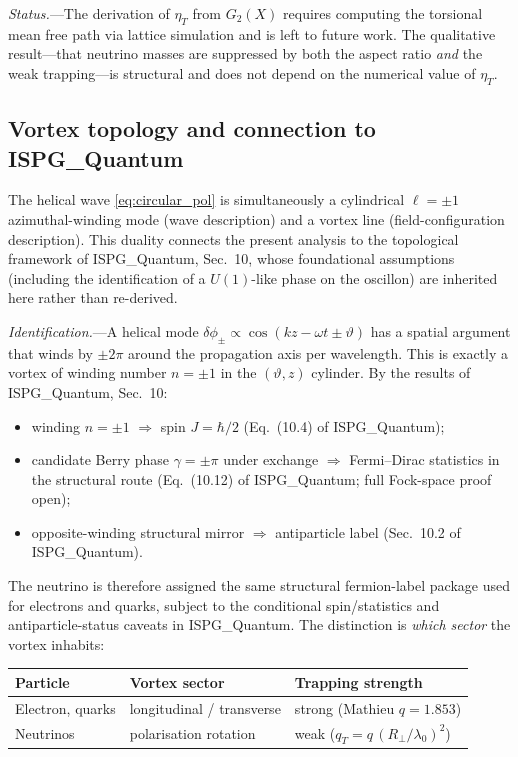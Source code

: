 \documentclass[11pt]{article}
\begin{document}
\textit{Status.}---The derivation of $\eta_T$ from
$G_2(X)$ requires computing the torsional mean free
path via lattice simulation and is left to future
work.  The qualitative result---that neutrino masses
are suppressed by both the aspect ratio
\emph{and} the weak trapping---is structural and
does not depend on the numerical value of $\eta_T$.

\subsection{Vortex topology and connection to
ISPG\_Quantum}
\label{sec:neutrino_vortex}

The helical wave \eqref{eq:circular_pol} is
simultaneously a cylindrical $\ell = \pm 1$
azimuthal-winding mode (wave description) and a
vortex line (field-configuration description).
This duality connects the present analysis to the
topological framework of ISPG\_Quantum, Sec.~10,
whose foundational assumptions (including the
identification of a $U(1)$-like phase on the
oscillon) are inherited here rather than
re-derived.

\textit{Identification.}---A helical mode
$\delta\phi_\pm \propto
\cos(kz - \omega t \pm \vartheta)$ has a spatial
argument that winds by $\pm 2\pi$ around the
propagation axis per wavelength.  This is
exactly a vortex of winding number
$n = \pm 1$ in the $(\vartheta, z)$ cylinder.
By the results of ISPG\_Quantum, Sec.~10:
\begin{itemize}
  \item winding $n = \pm 1$ $\Rightarrow$
    spin $J = \hbar/2$
    (Eq.~(10.4) of ISPG\_Quantum);
  \item candidate Berry phase $\gamma = \pm\pi$
    under exchange $\Rightarrow$
    Fermi--Dirac statistics in the structural route
    (Eq.~(10.12) of ISPG\_Quantum; full Fock-space
    proof open);
  \item opposite-winding structural mirror $\Rightarrow$
    antiparticle label
    (Sec.~10.2 of ISPG\_Quantum).
\end{itemize}

The neutrino is therefore assigned the same structural
fermion-label package used for electrons and quarks,
subject to the conditional spin/statistics and
antiparticle-status caveats in ISPG\_Quantum.  The
distinction is \emph{which sector} the vortex
inhabits:

\begin{center}
\renewcommand{\arraystretch}{1.3}
\begin{tabular}{@{}lll@{}}
\textbf{Particle} & \textbf{Vortex sector}
  & \textbf{Trapping strength} \\\hline
Electron, quarks
  & longitudinal / transverse
  & strong (Mathieu $q = 1.853$) \\
Neutrinos
  & polarisation rotation
  & weak ($q_T = q\,(R_\perp/\lambda_0)^2$)
\end{tabular}
\end{center}
\end{document}
